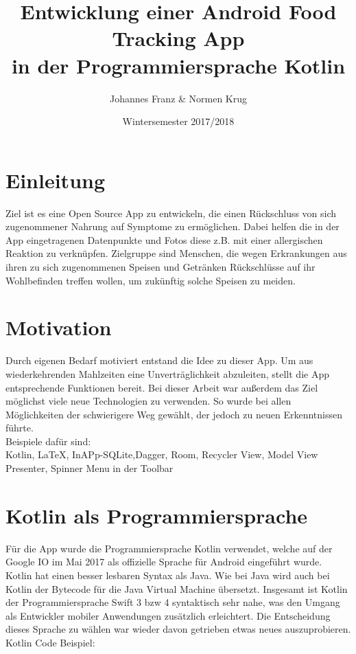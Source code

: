 \documentclass[
    DIV12,
    cleardouble=plain,
    headings=normal,
    pdftex,
    headexclude,footexclude,
    final
]{scrreprt}
\title{
  Entwicklung einer Android Food Tracking App \\[1em]
  in der Programmiersprache Kotlin  
}
\author{Johannes Franz \& Normen Krug}
\date{Wintersemester 2017/2018}
\begin{document}
\maketitle



\tableofcontents


\newpage
{}


\chapter{Einleitung}
Ziel ist es eine Open Source App zu entwickeln, die einen Rückschluss von sich zugenommener Nahrung auf Symptome zu ermöglichen. Dabei helfen die in der App eingetragenen Datenpunkte und Fotos diese z.B. mit einer allergischen Reaktion zu verknüpfen.
Zielgruppe sind Menschen, die wegen Erkrankungen aus ihren zu sich zugenommenen Speisen und Getränken Rückschlüsse auf ihr Wohlbefinden treffen wollen, um zukünftig solche Speisen zu meiden.


\newpage

\chapter{Motivation}
Durch eigenen Bedarf motiviert entstand die Idee zu dieser App. Um aus wiederkehrenden Mahlzeiten eine Unverträglichkeit abzuleiten, stellt die App entsprechende Funktionen bereit.
Bei dieser Arbeit war außerdem das Ziel möglichst viele neue Technologien zu verwenden. So wurde bei allen Möglichkeiten der schwierigere Weg gewählt, der jedoch zu neuen Erkenntnissen führte.\\
Beispiele dafür sind:\\
Kotlin, LaTeX, InAPp-SQLite,Dagger, Room, Recycler View, Model View Presenter, Spinner Menu in der Toolbar


\chapter{Kotlin als Programmiersprache}
Für die App wurde die Programmiersprache Kotlin verwendet, welche auf der Google IO im Mai 2017 als offizielle Sprache für Android eingeführt wurde. Kotlin hat einen besser lesbaren Syntax als Java. Wie bei Java wird auch bei Kotlin der Bytecode für die Java Virtual Machine übersetzt. Insgesamt ist Kotlin der Programmiersprache Swift 3 bzw 4 syntaktisch sehr nahe, was den Umgang als Entwickler mobiler Anwendungen zusätzlich erleichtert. Die Entscheidung dieses Sprache zu wählen war wieder davon getrieben etwas neues auszuprobieren.\\
Kotlin Code Beispiel:

\end{document}
